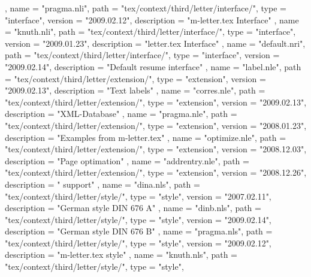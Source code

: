 {{    } ,
    {
        name        = "pragma.nli",
        path        = "tex/context/third/letter/interface/",
        type        = "interface",
        version     = "2009.02.12",
        description = "m-letter.tex Interface"
    } ,
    {
        name        = "knuth.nli",
        path        = "tex/context/third/letter/interface/",
        type        = "interface",
        version     = "2009.01.23",
        description = "letter.tex Interface"
    } ,
    {
        name        = "default.nri",
        path        = "tex/context/third/letter/interface/",
        type        = "interface",
        version     = "2009.02.14",
        description = "Default resume interface"
    } ,
    {
        name        = "label.nle",
        path        = "tex/context/third/letter/extension/",
        type        = "extension",
        version     = "2009.02.13",
        description = "Text labels"
    } ,
    {
        name        = "corres.nle",
        path        = "tex/context/third/letter/extension/",
        type        = "extension",
        version     = "2009.02.13",
        description = "XML-Database"
    } ,
    {
        name        = "pragma.nle",
        path        = "tex/context/third/letter/extension/",
        type        = "extension",
        version     = "2008.01.23",
        description = "Examples from m-letter.tex"
    } ,
    {
        name        = "optimize.nle",
        path        = "tex/context/third/letter/extension/",
        type        = "extension",
        version     = "2008.12.03",
        description = "Page optimation"
    } ,
    {
        name        = "addrentry.nle",
        path        = "tex/context/third/letter/extension/",
        type        = "extension",
        version     = "2008.12.26",
        description = " support"
    } ,
    {
        name        = "dina.nls",
        path        = "tex/context/third/letter/style/",
        type        = "style",
        version     = "2007.02.11",
        description = "German style DIN 676 A"
    } ,
    {
        name        = "dinb.nls",
        path        = "tex/context/third/letter/style/",
        type        = "style",
        version     = "2009.02.14",
        description = "German style DIN 676 B"
    } ,
    {
        name        = "pragma.nls",
        path        = "tex/context/third/letter/style/",
        type        = "style",
        version     = "2009.02.12",
        description = "m-letter.tex style"
    } ,
    {
        name        = "knuth.nls",
        path        = "tex/context/third/letter/style/",
        type        = "style",
}}
